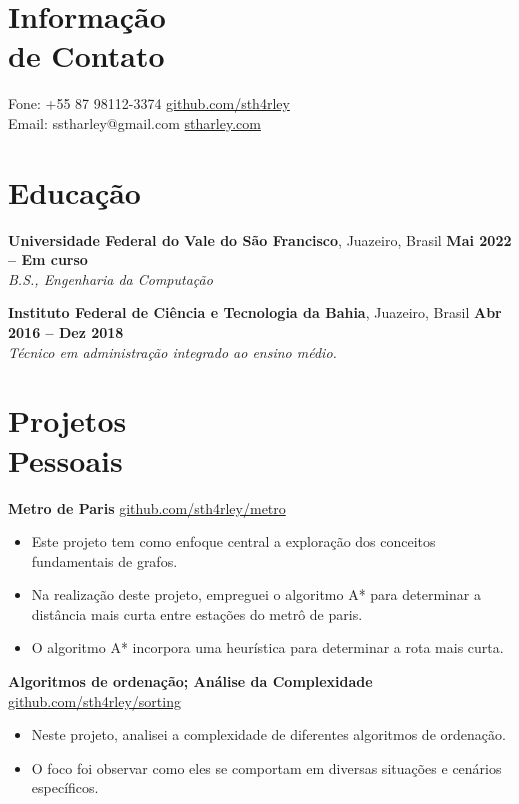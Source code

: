 \documentclass[margin,line]{resume}
\begin{document}
\begin{resume}
    \section{\mysidestyle Informação\\de Contato}

    Fone: +55 87 98112-3374 \hfill \url{github.com/sth4rley}\\
    \noindent Email: sstharley@gmail.com \hfill \url{stharley.com}

    \section{\mysidestyle Educação}

    \textbf{Universidade Federal do Vale do São Francisco}, Juazeiro, Brasil \hfill \textbf{Mai 2022 -- Em curso}\\
    \textsl{B.S., Engenharia da Computação}\

    \textbf{Instituto Federal de Ciência e Tecnologia da Bahia}, Juazeiro, Brasil \hfill \textbf{Abr 2016 -- Dez 2018}\\
    \textsl{Técnico em administração integrado ao ensino médio.}


    \section{\mysidestyle Projetos\\Pessoais}

    \textbf{Metro de Paris} \hfill \url{github.com/sth4rley/metro}
    \begin{itemize}
        \item Este projeto tem como enfoque central a exploração dos conceitos fundamentais de grafos.
        \item Na realização deste projeto, empreguei o algoritmo A* para determinar a distância mais curta entre estações do metrô de paris.
        \item O algoritmo A* incorpora uma heurística para determinar a rota mais curta.
    \end{itemize}

    \textbf{Algoritmos de ordenação; Análise da Complexidade} \hfill \url{github.com/sth4rley/sorting}
    \begin{itemize}
        \item Neste projeto, analisei a complexidade de diferentes algoritmos de ordenação.
        \item  O foco foi observar como eles se comportam em diversas situações e cenários específicos.
    \end{itemize}


\end{resume}
\end{document}
